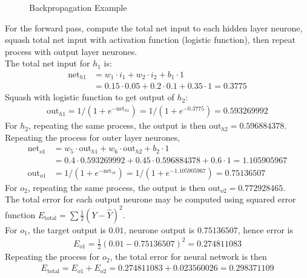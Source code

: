 \begin{example} 
\begin{figure}[H]
\centering
\scalebox{0.75}{}
\caption{Backpropagation Example}
\end{figure}
For the forward pass, compute the total net input to each hidden layer neurone, squash total net input with activation function (logistic function), then repeat process with output layer neurones.\\
The total net input for $h_1$ is:
\begin{align}
\text{net}_{h1} &= w_1 \cdot i_1 + w_2 \cdot i_2 + b_1 \cdot 1 \nonumber \\
&= 0.15 \cdot 0.05 + 0.2 \cdot 0.1 + 0.35 \cdot 1 = 0.3775 \nonumber
\end{align}
Squash with logistic function to get output of $h_2$:
\begin{align}
\text{out}_{h1} = 1/(1 + e^{-\text{net}_{h1}}) = 1/(1 + e^{-0.3775}) = 0.593269992 \nonumber
\end{align}
For $h_2$, repeating the same process, the output is then $\text{out}_{h2} = 0.596884378$.\\
Repeating the process for outer layer neurones,
\begin{align}
\text{net}_{o1} &= w_5 \cdot \text{out}_{h1} + w_6 \cdot \text{out}_{h2} + b_2 \cdot 1 \nonumber \\
&= 0.4 \cdot 0.593269992 + 0.45 \cdot 0.596884378 + 0.6 \cdot 1 = 1.105905967 \nonumber \\
\text{out}_{o1} &= 1/(1 + e^{-\text{net}_{o1}}) = 1/(1 + e^{-1.105905967}) = 0.75136507 \nonumber
\end{align}
For $o_2$, repeating the same process, the output is then $\text{out}_{o2} = 0.772928465$.\\
The total error for each output neurone may be computed using squared error function $E_{\text{total}} = \sum \frac{1}{2} (Y - \hat{Y})^2$.\\
For $o_1$, the target output is $0.01$, neurone output is $0.75136507$, hence error is
\begin{align}
E_{o1} = \frac{1}{2} (0.01 - 0.75136507)^2 = 0.274811083 \nonumber
\end{align}
Repeating the process for $o_2$, the total error for neural network is then
\begin{align}
E_{\text{total}} = E_{o1} + E_{o2} = 0.274811083 + 0.023560026 = 0.298371109 \nonumber

\end{align}
\end{example}
